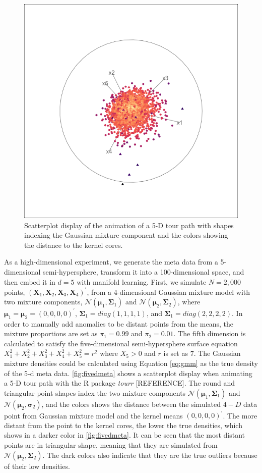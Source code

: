 \documentclass[11pt,a4paper,]{article}
\begin{document}
\begin{figure}

{\centering \includegraphics[width=0.7\linewidth]{figures/tourr_5d_semisphere} 

}

\caption{Scatterplot display of the animation of a 5-D tour path with shapes indexing the Gaussian mixture component and the colors showing the distance to the kernel cores.}\label{fig:fivedmeta}
\end{figure}

As a high-dimensional experiment, we generate the meta data from a 5-dimensional semi-hypersphere, transform it into a 100-dimensional space, and then embed it in \(d=5\) with manifold learning. First, we simulate \(N=2,000\) points, \((\pmb{X}_1, \pmb{X}_2, \pmb{X}_3, \pmb{X}_4)^\prime\), from a 4-dimensional Gaussian mixture model with two mixture components, \(\mathcal{N}(\pmb{\mu}_1, \pmb{\Sigma}_1)\) and \(\mathcal{N}(\pmb{\mu}_2, \pmb{\Sigma}_2)\), where \(\pmb{\mu}_1 = \pmb{\mu}_2 =(0, 0, 0, 0)^\prime\), \(\pmb{\Sigma}_1 = diag(1,1,1,1)\), and \(\pmb{\Sigma}_1 = diag(2,2,2,2)\). In order to manually add anomalies to be distant points from the means, the mixture proportions are set as \(\pi_1=0.99\) and \(\pi_2=0.01\).
The fifth dimension is calculated to satisfy the five-dimensional semi-hypersphere surface equation \(X_1^2 + X_2^2 + X_3^2 + X_4^2 + X_5^2 = r^2\) where \(X_5>0\) and \(r\) is set as \(7\).
The Gaussian mixture densities could be calculated using Equation \eqref{eq:gmm} as the true density of the 5-d meta data. \autoref{fig:fivedmeta} shows a scatterplot display when animating a 5-D tour path with the R package \emph{tourr} {[}REFERENCE{]}. The round and triangular point shapes index the two mixture components \(\mathcal{N}(\pmb{\mu}_1, \pmb{\Sigma}_1)\) and \(\mathcal{N}(\pmb{\mu}_2, \pmb{\sigma}_2)\), and the colors shows the distance between the simulated \(4-D\) data point from Gaussian mixture model and the kernel means \((0, 0, 0, 0)^\prime\). The more distant from the point to the kernel cores, the lower the true densities, which shows in a darker color in \autoref{fig:fivedmeta}. It can be seen that the most distant points are in triangular shape, meaning that they are simulated from \(\mathcal{N}(\pmb{\mu}_2, \pmb{\Sigma}_2)\). The dark colors also indicate that they are the true outliers because of their low densities.
\end{document}
